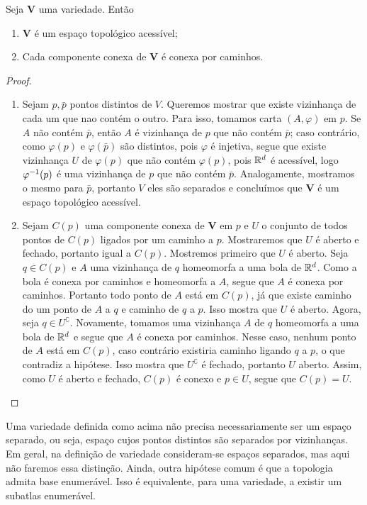 \begin{prop}
Seja $\bm V$ uma variedade. Então
	\begin{enumerate}
	\item $\bm V$  é um espaço topológico acessível;
	\item Cada componente conexa de $\bm V$ é conexa por caminhos.
	\end{enumerate}
\end{prop}
\begin{proof}
	\begin{enumerate}
	\item Sejam $p,\bar p$ pontos distintos de $V$. Queremos mostrar que existe vizinhança de cada um que nao contém o outro. Para isso, tomamos carta $(A,\varphi)$ em $p$. Se $A$ não contém $\bar p$, então $A$ é vizinhança de $p$ que não contém $\bar p$; caso contrário, como $\varphi(p)$ e $\varphi(\bar p)$ são distintos, pois $\varphi$ é injetiva, segue que existe vizinhança $U$ de $\varphi(p)$ que não contém $\varphi(p)$, pois $\mathbb{R}^d$ é acessível, logo $\varphi^{-1}(p)$ é uma vizinhança de $p$ que não contém $\bar p$. Analogamente, mostramos o mesmo para $\bar p$, portanto $V$ eles são separados e concluímos que $\bm V$ é um espaço topológico acessível.
	
	\item Sejam $C(p)$ uma componente conexa de $\bm V$ em $p$ e $U$ o conjunto de todos pontos de $C(p)$ ligados por um caminho a $p$. Mostraremos que $U$ é aberto e fechado, portanto igual a $C(p)$. Mostremos primeiro que $U$ é aberto. Seja $q \in C(p)$ e $A$ uma vizinhança de $q$ homeomorfa a uma bola de $\mathbb{R}^d$. Como a bola é conexa por caminhos e homeomorfa a $A$, segue que $A$ é conexa por caminhos. Portanto todo ponto de $A$ está em $C(p)$, já que existe caminho do um ponto de $A$ a $q$ e caminho de $q$ a $p$. Isso mostra que $U$ é aberto. Agora, seja $q \in U^\complement$. Novamente, tomamos uma vizinhança $A$ de $q$ homeomorfa a uma bola de $\mathbb{R}^d$ e segue que $A$ é conexa por caminhos. Nesse caso, nenhum ponto de $A$ está em $C(p)$, caso contrário existiria caminho ligando $q$ a $p$, o que contradiz a hipótese. Isso mostra que $U^\complement$ é fechado, portanto $U$ aberto. Assim, como $U$ é aberto e fechado, $C(p)$ é conexo e $p \in U$, segue que $C(p)=U$.
	\end{enumerate}
\end{proof}

Uma variedade definida como acima não precisa necessariamente ser um espaço separado, ou seja, espaço cujos pontos distintos são separados por vizinhanças. Em geral, na definição de variedade consideram-se espaços separados, mas aqui não faremos essa distinção. Ainda, outra hipótese comum é que a topologia admita base enumerável. Isso é equivalente, para uma variedade, a existir um subatlas enumerável.




















